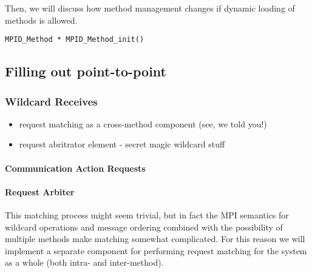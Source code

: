 Then, we will discuss how method management changes if dynamic
loading of methods is allowed.

\begin{verbatim}
MPID_Method * MPID_Method_init()
\end{verbatim}


\subsection{Filling out point-to-point}

\subsubsection{Wildcard Receives}
\begin{itemize}
  \item request matching as a cross-method component (see, we told you!)
  \item request abritrator element - secret magic wildcard stuff
\end{itemize}

\paragraph{Communication Action Requests}

\paragraph{Request Arbiter}

%

This matching process might seem trivial, but in fact the MPI semantics for
wildcard operations and message ordering combined with the possibility of
multiple methods make matching somewhat complicated.
For this reason we will implement a separate 
component for performing request matching for the
system as a whole (both intra- and inter-method).

